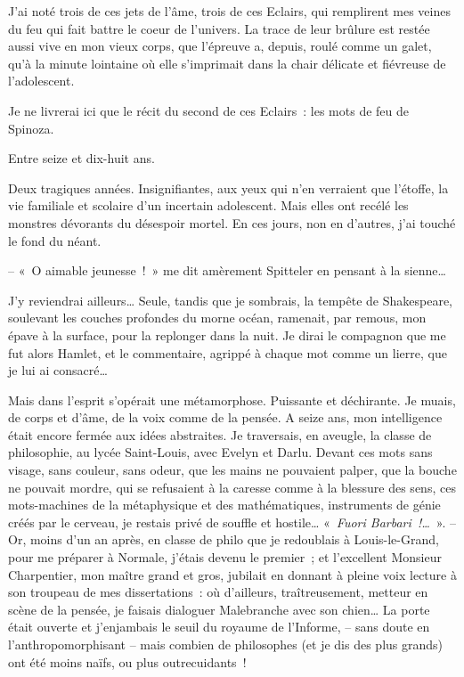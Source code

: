 J'ai noté trois de ces jets de l'âme, trois de ces Eclairs, qui
remplirent mes veines du feu qui fait battre le coeur de l'univers. La
trace de leur brûlure est restée aussi vive en mon vieux corps, que
l'épreuve a, depuis, roulé comme un galet, qu'à la minute lointaine où
elle s'imprimait dans la chair délicate et fiévreuse de l'adolescent.

Je ne livrerai ici que le récit du second de ces Eclairs~: les mots de
feu de Spinoza.

Entre seize et dix-huit ans.

Deux tragiques années. Insignifiantes, aux yeux qui n'en verraient que
l'étoffe, la vie familiale et scolaire d'un incertain adolescent. Mais
elles ont recélé les monstres dévorants du désespoir mortel. En ces
jours, non en d'autres, j'ai touché le fond du néant.

-- «~O aimable jeunesse~!~» me dit amèrement Spitteler en pensant à la
sienne\ldots{}

J'y reviendrai ailleurs\ldots{} Seule, tandis que je sombrais, la tempête de
Shakespeare, soulevant les couches profondes du morne océan, ramenait,
par remous, mon épave à la surface, pour la replonger dans la nuit. Je
dirai le compagnon que me fut alors Hamlet, et le commentaire, agrippé à
chaque mot comme un lierre, que je lui ai consacré\ldots{}

Mais dans l'esprit s'opérait une métamorphose. Puissante et déchirante.
Je muais, de corps et d'âme, de la voix comme de la pensée. A seize ans,
mon intelligence était encore fermée aux idées abstraites. Je
traversais, en aveugle, la classe de philosophie, au lycée Saint-Louis,
avec Evelyn et Darlu. Devant ces mots sans visage, sans couleur, sans
odeur, que les mains ne pouvaient palper, que la bouche ne pouvait
mordre, qui se refusaient à la caresse comme à la blessure des sens, ces
mots-machines de la métaphysique et des mathématiques, instruments de
génie créés par le cerveau, je restais privé de souffle et hostile\ldots{}
«~\emph{Fuori Barbari~!\ldots{}}~». -- Or, moins d'un an après, en classe de
philo que je redoublais à Louis-le-Grand, pour me préparer à Normale,
j'étais devenu le premier~; et l'excellent Monsieur Charpentier, mon
maître grand et gros, jubilait en donnant à pleine voix lecture à son
troupeau de mes dissertations~: où d'ailleurs, traîtreusement, metteur
en scène de la pensée, je faisais dialoguer Malebranche avec son
chien\ldots{} La porte était ouverte et j'enjambais le seuil du royaume de
l'Informe, -- sans doute en l'anthropomorphisant -- mais combien de
philosophes (et je dis des plus grands) ont été moins naïfs, ou plus
outrecuidants~!


